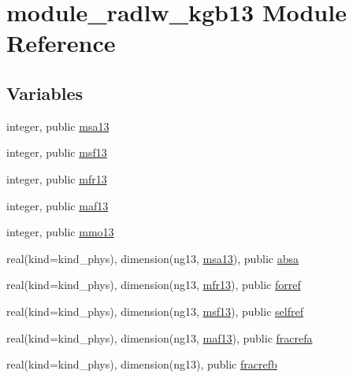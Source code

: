 \hypertarget{namespacemodule__radlw__kgb13}{}\section{module\+\_\+radlw\+\_\+kgb13 Module Reference}
\label{namespacemodule__radlw__kgb13}
\subsection*{Variables}
\begin{DoxyCompactItemize}
\item 
integer, public \hyperlink{namespacemodule__radlw__kgb13_a07932a22e5f8de248765a207e170ce6f}{msa13}
\item 
integer, public \hyperlink{group__module__radlw__main_ga7f88590d2a9fc392b04e89fd3d4bf2bf}{msf13}
\item 
integer, public \hyperlink{group__module__radlw__main_ga158782c955af9f50aaefea2d49af97ce}{mfr13}
\item 
integer, public \hyperlink{group__module__radlw__main_ga1ddc025df872b12194b8c6344cc0204e}{maf13}
\item 
integer, public \hyperlink{group__module__radlw__main_gae513ce55829a57a0dbda77f570e4a619}{mmo13}
\item 
real(kind=kind\+\_\+phys), dimension(ng13, \hyperlink{namespacemodule__radlw__kgb13_a07932a22e5f8de248765a207e170ce6f}{msa13}), public \hyperlink{group__module__radlw__main_ga22ce8d48ac3dceae1d52e80097fc2689}{absa}
\item 
real(kind=kind\+\_\+phys), dimension(ng13, \hyperlink{group__module__radlw__main_ga158782c955af9f50aaefea2d49af97ce}{mfr13}), public \hyperlink{group__module__radlw__main_ga93c6546ef5f8cbfc4f63de29e1ba2452}{forref}
\item 
real(kind=kind\+\_\+phys), dimension(ng13, \hyperlink{group__module__radlw__main_ga7f88590d2a9fc392b04e89fd3d4bf2bf}{msf13}), public \hyperlink{group__module__radlw__main_gac8f58bba6aa4b72ffd01f78e60d0831f}{selfref}
\item 
real(kind=kind\+\_\+phys), dimension(ng13, \hyperlink{group__module__radlw__main_ga1ddc025df872b12194b8c6344cc0204e}{maf13}), public \hyperlink{group__module__radlw__main_ga82aed8a05cd528b287e336f7ff8fcebb}{fracrefa}
\item 
real(kind=kind\+\_\+phys), dimension(ng13), public \hyperlink{group__module__radlw__main_ga92d45aee9dab62549ea8821eae7422dd}{fracrefb}
\item 

\end{DoxyCompactItemize}
